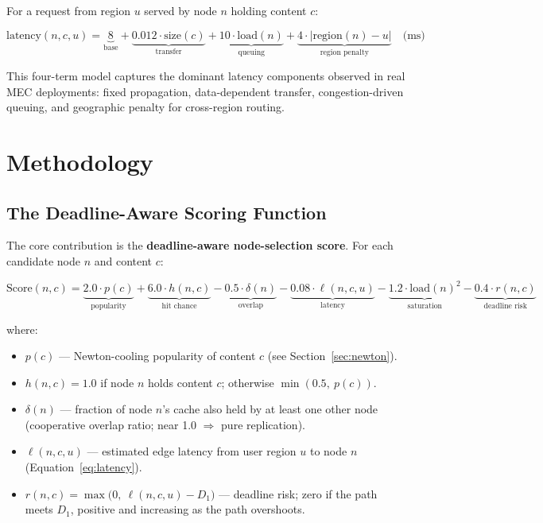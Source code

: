 \documentclass[12pt,a4paper]{report}
\begin{document}
For a request from region $u$ served by node $n$ holding content $c$:

\begin{equation}
  \text{latency}(n, c, u) =
  \underbrace{8}_{\text{base}}
  + \underbrace{0.012 \cdot \text{size}(c)}_{\text{transfer}}
  + \underbrace{10 \cdot \text{load}(n)}_{\text{queuing}}
  + \underbrace{4 \cdot |\text{region}(n) - u|}_{\text{region penalty}} \quad \text{(ms)}
  \label{eq:latency}
\end{equation}

This four-term model captures the dominant latency components observed in real MEC
deployments: fixed propagation, data-dependent transfer, congestion-driven queuing, and
geographic penalty for cross-region routing.

\section{Methodology}

\subsection{The Deadline-Aware Scoring Function}

The core contribution is the \textbf{deadline-aware node-selection score}. For each
candidate node $n$ and content $c$:

\begin{equation}
  \text{Score}(n, c) =
  \underbrace{2.0 \cdot p(c)}_{\text{popularity}}
  + \underbrace{6.0 \cdot h(n,c)}_{\text{hit chance}}
  - \underbrace{0.5 \cdot \delta(n)}_{\text{overlap}}
  - \underbrace{0.08 \cdot \ell(n,c,u)}_{\text{latency}}
  - \underbrace{1.2 \cdot \text{load}(n)^2}_{\text{saturation}}
  - \underbrace{0.4 \cdot r(n,c)}_{\text{deadline risk}}
  \label{eq:score}
\end{equation}

where:
\begin{itemize}
  \item $p(c)$ --- Newton-cooling popularity of content $c$ (see Section~\ref{sec:newton}).
  \item $h(n,c) = 1.0$ if node $n$ holds content $c$; otherwise $\min(0.5,\ p(c))$.
  \item $\delta(n)$ --- fraction of node $n$'s cache also held by at least one other node
        (cooperative overlap ratio; near 1.0 $\Rightarrow$ pure replication).
  \item $\ell(n,c,u)$ --- estimated edge latency from user region $u$ to node $n$
        (Equation~\ref{eq:latency}).
  \item $r(n,c) = \max\!\bigl(0,\ \ell(n,c,u) - D_1\bigr)$ --- deadline risk; zero if the
        path meets $D_1$, positive and increasing as the path overshoots.
\end{itemize}
\end{document}
